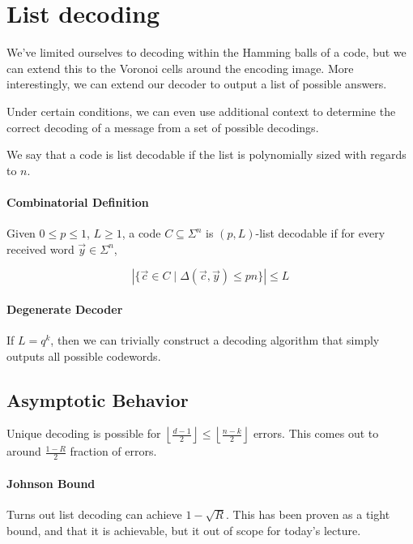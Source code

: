 \documentclass{idc_msc}
\begin{document}
\section{List decoding}

We've limited ourselves to decoding within the Hamming balls of a code, but we can extend this to the Voronoi cells around the encoding image. More interestingly, we can extend our decoder to output a list of possible answers.

Under certain conditions, we can even use additional context to determine the correct decoding of a message from a set of possible decodings.

We say that a code is list decodable if the list is polynomially sized with regards to \(n\).

\paragraph{Combinatorial Definition}

Given \(0 \le p \le 1\), \(L \ge 1\), a code \(C \subseteq \Sigma^n\) is \((p,L)\)-list decodable if for every received word \(\vec{y} \in \Sigma^n\),

\[|\{\vec{c}\in C \mid \Delta(\vec{c}, \vec{y}) \le pn\}| \le L\]

\paragraph{Degenerate Decoder}

If \(L = q^k\), then we can trivially construct a decoding algorithm that simply outputs all possible codewords.

\subsection{Asymptotic Behavior}

Unique decoding is possible for \(\left\lfloor\frac{d-1}{2}\right\rfloor \le \left\lfloor\frac{n-k}{2}\right\rfloor\) errors.
This comes out to around \(\frac{1-R}{2}\) fraction of errors.

\paragraph{Johnson Bound}

Turns out list decoding can achieve \(1 - \sqrt{R}\).
This has been proven as a tight bound, and that it is achievable, but it out of scope for today's lecture.
\end{document}
